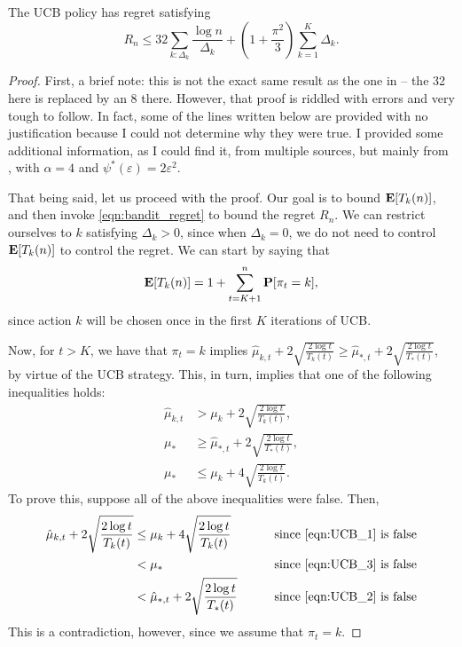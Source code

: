 \begin{theorem}
The UCB policy has regret satisfying
\[
R_n \leq 32 \sum_{k : \Delta_k} \frac{\log n}{\Delta_k} + \left(1 + \frac{\pi^2}{3} \right) \sum_{k=1}^K \Delta_k.
\]
\end{theorem}

\begin{proof}
First, a brief note: this is not the exact same result as the one in \cite[Lecture~18]{rigollet} -- the 32 here is replaced by an 8 there. However, that proof is riddled with errors and very tough to follow. In fact, some of the lines written below are provided with no justification because I could not determine why they were true. I provided some additional information, as I could find it, from multiple sources, but mainly from \cite[Theorem~2.1]{bubeck2012regret}, with $\alpha = 4$ and $\psi^*(\varepsilon) = 2 \varepsilon^2$. 

That being said, let us proceed with the proof. Our goal is to bound $\mathbf{E}[T_k(n)]$, and then invoke \eqref{eqn:bandit_regret} to bound the regret $R_n$. We can restrict ourselves to $k$ satisfying $\Delta_k > 0$,  since when $\Delta_k = 0$, we do not need to control $\mathbf{E} [T_k(n)]$ to control the regret. We can start by saying that 
\[
\mathbf{E}[T_k(n)] = 1 + \sum_{t=K+1}^n \mathbf{P}[\pi_t = k],
\]
since action $k$ will be chosen once in the first $K$ iterations of UCB.

Now, for $t > K$, we have that $\pi_t = k$ implies $\hat \mu_{k, t} + 2 \sqrt{\frac{2 \log t}{T_k(t)}} \geq \hat \mu_{*, t} + 2 \sqrt{\frac{2 \log t}{T_*(t)}}$, by virtue of the UCB strategy. This, in turn, implies that one of the following inequalities holds:
\begin{align}
\hat \mu_{k, t} &> \mu_k + 2 \sqrt{\frac{2 \log t}{T_k(t)}}, \label{eqn:UCB_1} \\
\mu_* &\geq \hat \mu_{*, t} + 2 \sqrt{\frac{2 \log t}{T_*(t)}}, \label{eqn:UCB_2}\\
\mu_* &\leq \mu_k + 4 \sqrt{\frac{2 \log t}{T_k(t)}}. \label{eqn:UCB_3}
\end{align}
To prove this, suppose all of the above inequalities were false. Then, 
\begin{align*}
\hat \mu_{k, t} + 2 \sqrt{\frac{2 \log t}{T_k(t)}} &\leq \mu_k + 4 \sqrt{\frac{2 \log t}{T_k(t)}} &\qquad \text{since \eqref{eqn:UCB_1} is false}\\
&< \mu_* &\qquad \text{since \eqref{eqn:UCB_3} is false} \\
&< \hat \mu_{*, t} + 2 \sqrt{\frac{2 \log t}{T_*(t)}} &\qquad \text{since \eqref{eqn:UCB_2} is false}
\end{align*}
This is a contradiction, however, since we assume that $\pi_t = k$.


\end{proof}
